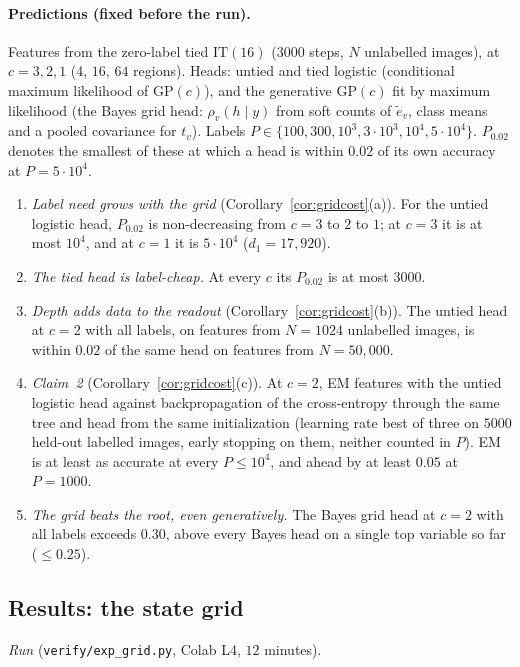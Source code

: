 \documentclass[11pt]{article}
\theoremstyle{definition}
\begin{document}
\paragraph{Predictions (fixed before the run).} Features from the zero-label tied $\mathrm{IT}(16)$ ($3000$ steps, $N$
unlabelled images), at $c=3,2,1$ ($4$, $16$, $64$ regions). Heads: untied and tied logistic (conditional maximum
likelihood of $\mathrm{GP}(c)$), and the generative $\mathrm{GP}(c)$ fit by maximum likelihood (the Bayes grid head:
$\rho_v(h\mid y)$ from soft counts of $\tilde e_v$, class means and a pooled covariance for $t_v$). Labels
$P\in\{100,300,10^3,3\cdot10^3,10^4,5\cdot10^4\}$. $P_{0.02}$ denotes the smallest of these at which a head is within $0.02$ of
its own accuracy at $P=5\cdot10^4$.
\begin{enumerate}
\item[(G1)] \emph{Label need grows with the grid} (Corollary~\ref{cor:gridcost}(a)). For the untied logistic head,
$P_{0.02}$ is non-decreasing from $c=3$ to $2$ to $1$; at $c=3$ it is at most $10^4$, and at $c=1$ it is $5\cdot10^4$
($d_1=17{,}920$).
\item[(G2)] \emph{The tied head is label-cheap.} At every $c$ its $P_{0.02}$ is at most $3000$.
\item[(G3)] \emph{Depth adds data to the readout} (Corollary~\ref{cor:gridcost}(b)). The untied head at $c=2$ with all
labels, on features from $N=1024$ unlabelled images, is within $0.02$ of the same head on features from $N=50{,}000$.
\item[(G4)] \emph{Claim~2} (Corollary~\ref{cor:gridcost}(c)). At $c=2$, EM features with the untied logistic head against
backpropagation of the cross-entropy through the same tree and head from the same initialization (learning rate best of
three on $5000$ held-out labelled images, early stopping on them, neither counted in $P$). EM is at least as accurate at
every $P\le10^4$, and ahead by at least $0.05$ at $P=1000$.
\item[(G5)] \emph{The grid beats the root, even generatively.} The Bayes grid head at $c=2$ with all labels exceeds $0.30$,
above every Bayes head on a single top variable so far ($\le0.25$).
\end{enumerate}

\subsection{Results: the state grid}\label{sec:grid-res}
\emph{Run} (\texttt{verify/exp\_grid.py}, Colab L4, $12$ minutes).
\end{document}
